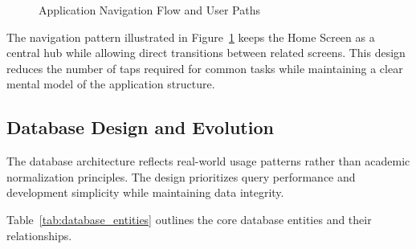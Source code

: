 \documentclass[11pt,a4paper]{article}
\begin{document}
\begin{figure}[H]
\centering
{}
\caption{Application Navigation Flow and User Paths}
\label{fig:navigation_flow}
\end{figure}

The navigation pattern illustrated in Figure~\ref{fig:navigation_flow} keeps the Home Screen as a central hub while allowing direct transitions between related screens. This design reduces the number of taps required for common tasks while maintaining a clear mental model of the application structure.

\subsection{Database Design and Evolution}

The database architecture reflects real-world usage patterns rather than academic normalization principles. The design prioritizes query performance and development simplicity while maintaining data integrity.

Table~\ref{tab:database_entities} outlines the core database entities and their relationships.
\end{document}
